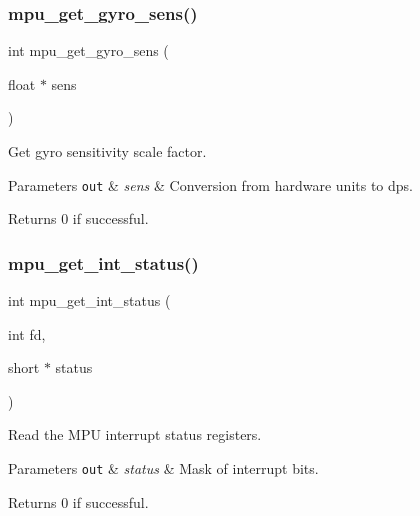 \subsubsection{mpu\+\_\+get\+\_\+gyro\+\_\+sens()}
{\footnotesize\ttfamily int mpu\+\_\+get\+\_\+gyro\+\_\+sens (\begin{DoxyParamCaption}\item[{float $\ast$}]{sens }\end{DoxyParamCaption})}



Get gyro sensitivity scale factor. 


\begin{DoxyParams}[1]{Parameters}
\mbox{\tt out}  & {\em sens} & Conversion from hardware units to dps. \\
\hline
\end{DoxyParams}
\begin{DoxyReturn}{Returns}
0 if successful. 
\end{DoxyReturn}
\mbox{\label{group___d_r_i_v_e_r_s_ga9024685ced2ea46d85f86c9a74bfc08f}} 
\subsubsection{mpu\+\_\+get\+\_\+int\+\_\+status()}
{\footnotesize\ttfamily int mpu\+\_\+get\+\_\+int\+\_\+status (\begin{DoxyParamCaption}\item[{int}]{fd,  }\item[{short $\ast$}]{status }\end{DoxyParamCaption})}



Read the M\+PU interrupt status registers. 


\begin{DoxyParams}[1]{Parameters}
\mbox{\tt out}  & {\em status} & Mask of interrupt bits. \\
\hline
\end{DoxyParams}
\begin{DoxyReturn}{Returns}
0 if successful. 
\end{DoxyReturn}
\mbox{\label{group___d_r_i_v_e_r_s_gaa95c7e216dcb2d888e9796001ca555f8}} 
